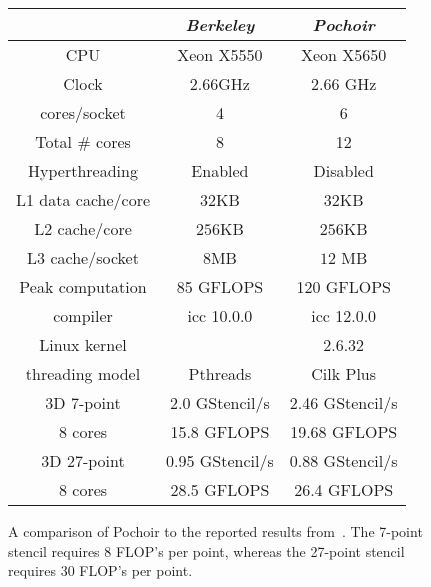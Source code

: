 \begin{figure}
\center
\small
\begin{tabular}{|c|c|c|}
\hline
                 & \textit{Berkeley}  & \textit{Pochoir}    \\ \hline
CPU              & Xeon X5550& Xeon X5650 \\
Clock            & $2.66$GHz & $2.66$ GHz \\
cores/socket     & 4         & 6          \\ 
Total \# cores   & 8         & 12         \\
Hyperthreading   & Enabled   & Disabled   \\
L1 data cache/core& $32$KB   &  $32$KB    \\
L2 cache/core    & $256$KB   & $256$KB    \\
L3 cache/socket  & $8$MB     & $12$ MB    \\
Peak computation & 85 GFLOPS & 120 GFLOPS \\ \hline
compiler         & icc 10.0.0& icc 12.0.0 \\
Linux kernel     &           & 2.6.32     \\ 
threading model  & Pthreads  & Cilk Plus  \\ \hline
3D 7-point & 2.0 GStencil/s & 2.46 GStencil/s \\
8 cores    & 15.8 GFLOPS     & 19.68 GFLOPS \\ \hline
3D 27-point& 0.95 GStencil/s & 0.88 GStencil/s \\
8 cores    & 28.5 GFLOPS     & 26.4 GFLOPS \\ \hline
\end{tabular}
\caption{A comparison of Pochoir to the reported results
  from~\cite{Datta09}.  The 7-point stencil requires 8 FLOP's per
  point, whereas the 27-point stencil requires 30 FLOP's per point.}
\label{fig:berkeley}
\end{figure}

